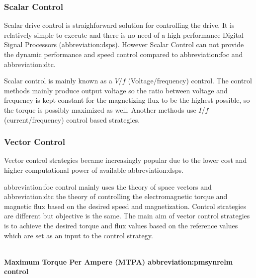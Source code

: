 \documentclass[a4paper, twoside, 11pt]{article}
\begin{document}
        \subsubsection{Scalar Control}
            Scalar drive control is straighforward solution for controlling the drive. It is relatively simple to execute and there is no need of a high performance Digital Signal Processors (\gls{abbreviation:dsp}s). However Scalar Control can not provide the dynamic performance and speed control compared to \gls{abbreviation:foc} and \gls{abbreviation:dtc}. \cite{dwivedi-review-on-control-strategies-of-permanent-magnet-assisted-synchronous-reluctance-motor-drive}\par
            Scalar control is mainly known as a $V$/$f$ (Voltage/frequency) control. The control methods mainly produce output voltage so the ratio between voltage and frequency is kept constant for the magnetizing flux to be the highest possible, so the torque is possibly maximized as well. Another methods use $I$/$f$ (current/frequency) control based strategies. \cite{heidari-a-review-of-synchronour-relucatence-motor-drive-advancements}

        \subsubsection{Vector Control}
            Vector control strategies became increasingly popular due to the lower cost and higher computational power of available \gls{abbreviation:dsp}s. \cite{dwivedi-review-on-control-strategies-of-permanent-magnet-assisted-synchronous-reluctance-motor-drive}
            \par
            \gls{abbreviation:foc} control mainly uses the theory of space vectors and \gls{abbreviation:dtc} the theory of controlling the electromagnetic torque and magnetic flux based on the desired speed and magnetization. Control strategies are different but objective is the same. The main aim of vector control strategies is to achieve the desired torque and flux values based on the reference values which are set as an input to the control strategy. \cite{heidari-a-review-of-synchronour-relucatence-motor-drive-advancements, dwivedi-review-on-control-strategies-of-permanent-magnet-assisted-synchronous-reluctance-motor-drive}

            \\ \noindet \textbf{Maximum Torque Per Ampere (MTPA) \gls{abbreviation:pmsynrelm} control}\par
\end{document}
